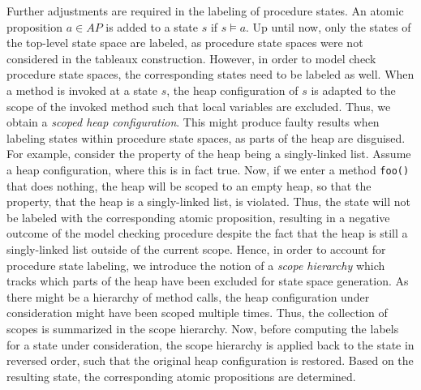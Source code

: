 \documentclass[a4paper, 12pt, twoside]{report}
\begin{document}
	Further adjustments are required in the labeling of procedure states. An atomic proposition $a \in AP$ is added to a state $s$ if $s \models a$.  Up until now, only the states of the top-level state space are labeled, as procedure state spaces were not considered in the tableaux construction. However, in order to model check procedure state spaces, the corresponding states need to be labeled as well. When a method is invoked at a state $s$, the heap configuration of $s$ is adapted to the scope of the invoked method such that local variables are excluded. Thus, we obtain a \textit{scoped heap configuration}. This might produce faulty results when labeling states within procedure state spaces, as parts of the heap are disguised. For example, consider the property of the heap being a singly-linked list. Assume a heap configuration, where this is in fact true. Now, if we enter a method \texttt{foo()} that does nothing, the heap will be scoped to an empty heap, so that the property, that the heap is a singly-linked list, is violated. Thus, the state will not be labeled with the corresponding atomic proposition, resulting in a negative outcome of the model checking procedure despite the fact that the heap is still a singly-linked list outside of the current scope. Hence, in order to account for procedure state labeling, we introduce the notion of a \textit{scope hierarchy} which tracks which parts of the heap have been excluded for state space generation. As there might be a hierarchy of method calls, the heap configuration under consideration might have been scoped multiple times. Thus, the collection of scopes is summarized in the scope hierarchy. Now, before computing the labels for a state under consideration, the scope hierarchy is applied back to the state in reversed order, such that the original heap configuration is restored. Based on the resulting state, the corresponding atomic propositions are determined.
	
\end{document}
